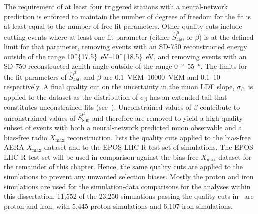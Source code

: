 The requirement of at least four triggered stations with a neural-network prediction is enforced to maintain the number of degrees of freedom for the fit is at least equal to the number of free fit parameters.
Other quality cuts include cutting events where at least one fit parameter (either $\hat{S}^{\mu}_{450}$ or $\beta$) is at the defined limit for that parameter, removing events with an SD-750 reconstructed energy outside of the range \qtyrange[parse-numbers=false]{10^{17.5}}{10^{18.5}}{\electronvolt}, and removing events with an SD-750 reconstructed zenith angle outside of the range \qtyrange{0}{55}{\degree}.
The limits for the fit parameters of $\hat{S}^{\mu}_{450}$ and $\beta$ are \qtyrange{0.1}{10000}{VEM} and \numrange{0.1}{10} respectively.
A final quality cut on the uncertainty in the muon LDF slope, $\sigma_{\beta}$, is applied to the dataset as the distribution of $\sigma_{\beta}$ has an extended tail that constitutes unconstrained fits (see~).
Unconstrained values of $\beta$ contribute to unconstrained values of $\hat{S}^{\mu}_{800}$ and therefore are removed to yield a high-quality subset of events with both a neural-network predicted muon observable and a bias-free radio $X_{\text{max}}$ reconstruction.
 lists the quality cuts applied to the bias-free AERA $X_{\text{max}}$ dataset and to the EPOS LHC-R test set of simulations.
The EPOS LHC-R test set will be used in comparison against the bias-free $X_{\text{max}}$ dataset for the remainder of this chapter.
Hence, the same quality cuts are applied to the simulations to prevent any unwanted selection biases.
Mostly the proton and iron simulations are used for the simulation-data comparisons for the analyses within this dissertation.
11,552 of the 23,250 simulations passing the quality cuts in~ are proton and iron, with 5,445 proton simulations and 6,107 iron simulations.

